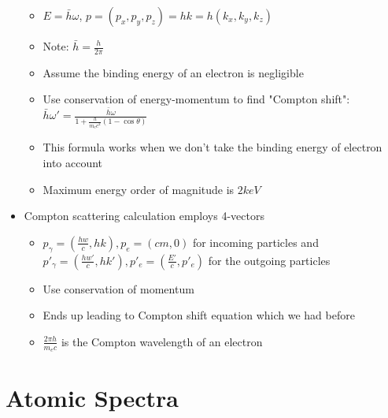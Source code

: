 \documentclass[12pt]{article}
\begin{document}
\begin{itemize}
\begin{itemize}
        \item $E = \bar{h} \omega$, $p = (p_x, p_y, p_z) = hk = h(k_x, k_y, k_z)$ 
        \item Note: $\bar{h} = \frac{h}{2 \pi}$
        \item Assume the binding energy of an electron is negligible
        \item Use conservation of energy-momentum to find "Compton shift": $\bar{h} \omega' = \frac{\bar{h} \omega}{1 + \frac{h}{m_c c^2}(1 - \cos \theta)}$
        \item This formula works when we don't take the binding energy of electron into account
        \item Maximum energy order of magnitude is $2 keV$
    \end{itemize}
    \item Compton scattering calculation employs 4-vectors \begin{itemize}
        \item $p_{\gamma} = (\frac{hw}{c}, hk), p_e = (cm, 0)$ for incoming particles and $p'_{\gamma} = (\frac{hw'}{c}, hk'), p'_e = (\frac{E'}{c}, p'_e)$ for the outgoing particles
        \item Use conservation of momentum
        \item Ends up leading to Compton shift equation which we had before
        \item $\frac{2 \pi h}{m_e c}$ is the Compton wavelength of an electron
    \end{itemize}
\end{itemize}

\section{Atomic Spectra}
\end{document}
